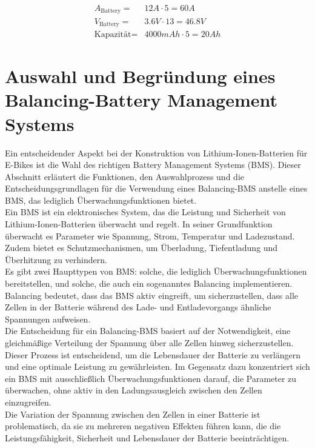 \begin{align}
    A_{\textrm{Battery}} =& 12 A\cdot 5 = 60 A\\
    V_{\textrm{Battery}} =& 3.6V \cdot 13 = 46.8V\\
    \textrm{Kapazität} =& 4000mAh \cdot 5 = 20 Ah
    \label{eq:Strom}
\end{align}

\section{Auswahl und Begründung eines Balancing-Battery Management Systems}
Ein entscheidender Aspekt bei der Konstruktion von Lithium-Ionen-Batterien für E-Bikes ist die Wahl des richtigen Battery Management Systems (BMS). Dieser Abschnitt erläutert die Funktionen, den Auswahlprozess und die Entscheidungsgrundlagen für die Verwendung eines Balancing-BMS anstelle eines BMS, das lediglich Überwachungsfunktionen bietet.\\
Ein BMS ist ein elektronisches System, das die Leistung und Sicherheit von Lithium-Ionen-Batterien überwacht und regelt. In seiner Grundfunktion überwacht es Parameter wie Spannung, Strom, Temperatur und Ladezustand. Zudem bietet es Schutzmechanismen, um Überladung, Tiefentladung und Überhitzung zu verhindern.\\
Es gibt zwei Haupttypen von BMS: solche, die lediglich Überwachungsfunktionen bereitstellen, und solche, die auch ein sogenanntes Balancing implementieren. Balancing bedeutet, dass das BMS aktiv eingreift, um sicherzustellen, dass alle Zellen in der Batterie während des Lade- und Entladevorgangs ähnliche Spannungen aufweisen.\\

Die Entscheidung für ein Balancing-BMS basiert auf der Notwendigkeit, eine gleichmäßige Verteilung der Spannung über alle Zellen hinweg sicherzustellen. Dieser Prozess ist entscheidend, um die Lebensdauer der Batterie zu verlängern und eine optimale Leistung zu gewährleisten. Im Gegensatz dazu konzentriert sich ein BMS mit ausschließlich Überwachungsfunktionen darauf, die Parameter zu überwachen, ohne aktiv in den Ladungsausgleich zwischen den Zellen einzugreifen.\\
Die Variation der Spannung zwischen den Zellen in einer Batterie ist problematisch, da sie zu mehreren negativen Effekten führen kann, die die Leistungsfähigkeit, Sicherheit und Lebensdauer der Batterie beeinträchtigen.\\

